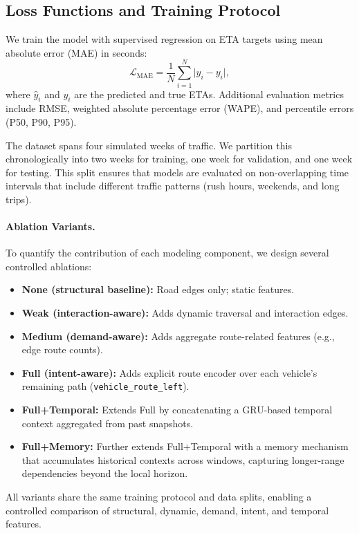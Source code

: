 \subsection{Loss Functions and Training Protocol}
We train the model with supervised regression on ETA targets using mean absolute error (MAE) in seconds:
\[
\mathcal{L}_{\text{MAE}} = \frac{1}{N}\sum_{i=1}^N \big| \hat{y}_i - y_i \big|,
\]
where $\hat{y}_i$ and $y_i$ are the predicted and true ETAs. Additional evaluation metrics include RMSE, weighted absolute percentage error (WAPE), and percentile errors (P50, P90, P95). 

The dataset spans four simulated weeks of traffic. We partition this chronologically into two weeks for training, one week for validation, and one week for testing. This split ensures that models are evaluated on non-overlapping time intervals that include different traffic patterns (rush hours, weekends, and long trips).

\paragraph{Ablation Variants.}
To quantify the contribution of each modeling component, we design several controlled ablations:
\begin{itemize}
    \item \textbf{None (structural baseline):} Road edges only; static features.
    \item \textbf{Weak (interaction-aware):} Adds dynamic traversal and interaction edges.
    \item \textbf{Medium (demand-aware):} Adds aggregate route-related features (e.g., edge route counts).
    \item \textbf{Full (intent-aware):} Adds explicit route encoder over each vehicle's remaining path (\texttt{vehicle\_route\_left}).
    \item \textbf{Full+Temporal:} Extends Full by concatenating a GRU-based temporal context aggregated from past snapshots.
    \item \textbf{Full+Memory:} Further extends Full+Temporal with a memory mechanism that accumulates historical contexts across windows, capturing longer-range dependencies beyond the local horizon.
\end{itemize}
All variants share the same training protocol and data splits, enabling a controlled comparison of structural, dynamic, demand, intent, and temporal features.
